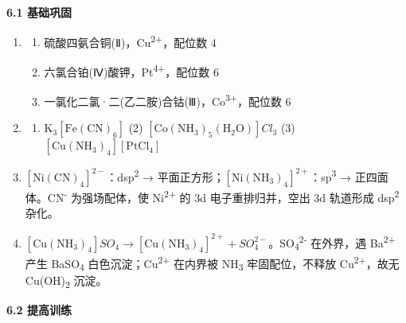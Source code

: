 \documentclass[a4paper,11pt]{ctexart}
\providecommand{\tightlist}{\setlength{\itemsep}{0pt}\setlength{\parskip}{0pt}}
\begin{document}
\textbf{6.1 基础巩固}

\begin{enumerate}
\def\labelenumi{\arabic{enumi}.}
\item
  \begin{enumerate}
  \def\labelenumii{(\arabic{enumii})}
  \tightlist
  \item
    硫酸四氨合铜(Ⅱ)，Cu\textsuperscript{2+}，配位数 4
  \item
    六氯合铂(Ⅳ)酸钾，Pt\textsuperscript{4+}，配位数 6
  \item
    一氯化二氯·二(乙二胺)合钴(Ⅲ)，Co\textsuperscript{3+}，配位数 6
  \end{enumerate}
\item
  \begin{enumerate}
  \def\labelenumii{(\arabic{enumii})}
  \tightlist
  \item
    \(\mathrm{K_3[Fe(CN)_6]}\) (2) \([\mathrm{Co(NH_3)_5(H_2O)}]Cl_3\) (3) \([\mathrm{Cu(NH_3)_4}][\mathrm{PtCl_4}]\)
  \end{enumerate}
\item
  \([\mathrm{Ni(CN)_4}]^{2-}\)：dsp\textsuperscript{2} → 平面正方形；\([\mathrm{Ni(NH_3)_4}]^{2+}\)：sp\textsuperscript{3} → 正四面体。CN\textsuperscript{-} 为强场配体，使 Ni\textsuperscript{2+} 的 3d 电子重排归并，空出 3d 轨道形成 dsp\textsuperscript{2} 杂化。
\item
  \([\mathrm{Cu(NH_3)_4}]SO_4 \rightarrow [\mathrm{Cu(NH_3)_4}]^{2+} + SO_4^{2-}\)。SO\textsubscript{4}\textsuperscript{2-} 在外界，遇 Ba\textsuperscript{2+} 产生 BaSO\textsubscript{4} 白色沉淀；Cu\textsuperscript{2+} 在内界被 NH\textsubscript{3} 牢固配位，不释放 Cu\textsuperscript{2+}，故无 Cu(OH)\textsubscript{2} 沉淀。
\end{enumerate}

\textbf{6.2 提高训练}
\end{document}

